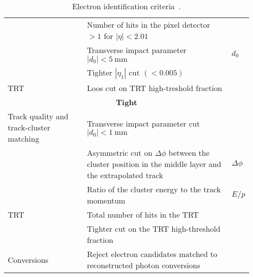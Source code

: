 \begin{table}[hbtp]
\begin{longtable}{@{}p{}p{}l@{}}
    & Number of hits in the pixel detector $>1$ for $|\eta|<2.01$ \\
    & Transverse impact parameter $|d_0|<\SI{5}{\mm}$ & $d_{0}$ \\
    & Tighter $|\eta_{1}|$ cut $(<0.005)$ \\
    TRT & Loos cut on TRT high-treshold fraction \\
    \midrule
    \multicolumn{3}{c}{\textbf{Tight}} \\ 
    Track quality and track-cluster matching & Transverse impact parameter cut $|d_0|<\SI{1}{\mm}$ \\ 
    & Asymmetric cut on $\Delta\phi$ between the cluster position in the middle layer and the extrapolated track & $\Delta\phi$ \\
    & Ratio of the cluster energy to the track momentum & $E/p$ \\
    TRT & Total number of hits in the TRT \\
    & Tighter cut on the TRT high-threshold fraction \\
    Conversions & Reject electron candidates matched to reconstructed photon conversions \\
    \bottomrule
  \end{longtable}
  \caption{Electron identification criteria~\cite{ElectronIDKeywords}.}
  \label{tab:DetectorAppElectronIDVariables}
\end{table}
